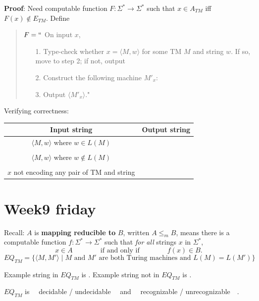 \documentclass[12pt, oneside]{article}
\begin{document}
{\bf Proof}: Need computable function  $F: \Sigma^* \to \Sigma^*$  such that  $x \in A_{TM}$ iff $F(x)  \notin  E_{TM}$.
Define
\begin{quote}
$F =  ``$ On input $x$,
\begin{itemize}
\item[1.] Type-check whether  $x = \langle M, w \rangle$ for some TM $M$ and string $w$.   If so, move to step 2; if  not, output 
\item[2.] Construct the following machine $M'_x$:
\vspace{50pt}
\item[3.] Output $\langle M'_x \rangle$."
\end{itemize}
\end{quote}

Verifying correctness:
\begin{center}
\begin{tabular}{|c|c|}
\hline
Input string &  Output string \\
\hline
$\langle M, w \rangle$ where  $w \in L(M)$ & \phantom{\hspace{4in}} \\
& \\
$\langle M, w \rangle$ where $w \notin L(M)$ & \\
&\\
$x$ not encoding any pair of  TM and string   &  \\
\hline
\end{tabular}
\end{center}

\newpage \vfill
\section*{Week9 friday}


Recall:  $A$ is  {\bf  mapping  reducible to} $B$, written $A \leq_m B$,  means there is a computable function 
$f : \Sigma^* \to \Sigma^*$ such that {\it for all} strings  $x$ in $\Sigma^*$, 
\[
x  \in  A \qquad \qquad \text{if and  only  if} \qquad \qquad f(x) \in B.
\]
\[
EQ_{TM} = \{ \langle M, M' \rangle \mid \text{$M$ and $M'$ are both Turing machines and $L(M) =L(M')$} \}
\]

Example  string in  $EQ_{TM}$ is \underline{\phantom{\hspace{1.5in}}} .
Example  string not  in  $EQ_{TM}$ is \underline{\phantom{\hspace{1.5in}}} .

$EQ_{TM}$ is ~~decidable /  undecidable~~ and ~~recognizable /  unrecognizable~~.
\end{document}
